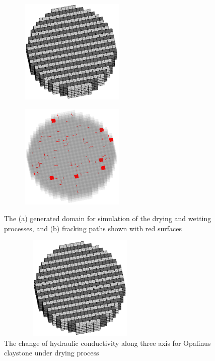 \begin{figure}[!ht]
\begin{subfigure}[c]{0.5\textwidth}
\centering
\includegraphics[width=5cm,height=5cm]{figures/Amir_ME6_Lattice_Setup.png}
\subcaption{}
\label{fig:Amir_ME6_Lattice_Setup}
\end{subfigure}
\begin{subfigure}[c]{0.5\textwidth}
\centering
\includegraphics[width=5cm,height=5cm]{figures/Amir_ME6_Lattice_Frack.png}
\subcaption{}
\label{fig:Amir_ME6_Lattice_Frack}
\end{subfigure}
\caption{The (a) generated domain for simulation of the drying and wetting processes, and (b) fracking paths shown with red surfaces}
\end{figure}


\begin{figure}[!ht]
\centering
\includegraphics[width=8cm,height=5cm]{figures/Amir_ME6_Lattice_Setup.png}
\caption{The change of hydraulic conductivity along three axis for Opalinus claystone under drying process}
\label{fig:Amir_ME6_Lattice_Drying}
\end{figure} 


